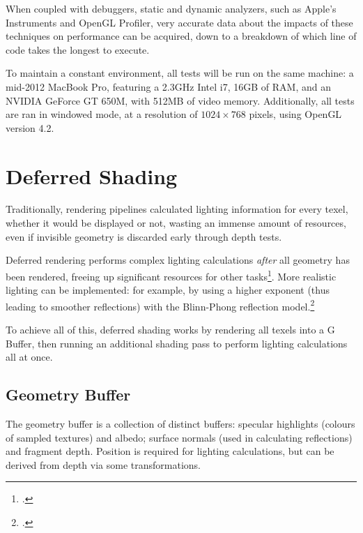 \documentclass[11pt, oneside]{report}
\begin{document}
When coupled with debuggers, static and dynamic analyzers, such as Apple's Instruments and \gls{OpenGL} Profiler, very accurate data about the impacts of these techniques on performance can be acquired, down to a breakdown of which line of code takes the longest to execute.

To maintain a constant environment, all tests will be run on the same machine: a mid-2012 MacBook Pro, featuring a 2.3GHz Intel i7, 16GB of RAM, and an NVIDIA GeForce GT 650M, with 512MB of video memory. Additionally, all tests are ran in windowed mode, at a resolution of $1024 \times 768$ pixels, using \gls{OpenGL} version 4.2.

\chapter{Deferred Shading}
Traditionally, rendering pipelines calculated lighting information for every \gls{texel}, whether it would be displayed or not, wasting an immense amount of resources, even if invisible geometry is discarded early through \glspl{depth test}.

Deferred rendering performs complex lighting calculations \textit{after} all geometry has been rendered, freeing up significant resources for other tasks\footcite{gpupro-deferred}. More realistic lighting can be implemented: for example, by using a higher exponent (thus leading to smoother reflections) with the \gls{Blinn-Phong reflection model}.\footcite{ferko-deferred}

To achieve all of this, deferred shading works by rendering all texels into a \gls{G Buffer}, then running an additional shading pass to perform lighting calculations all at once.

\section{Geometry Buffer}
The geometry buffer is a collection of distinct buffers: \gls{specular} highlights (colours of sampled textures) and albedo; surface normals (used in calculating reflections) and fragment depth. Position is required for lighting calculations, but can be derived from depth via some transformations.
\end{document}
